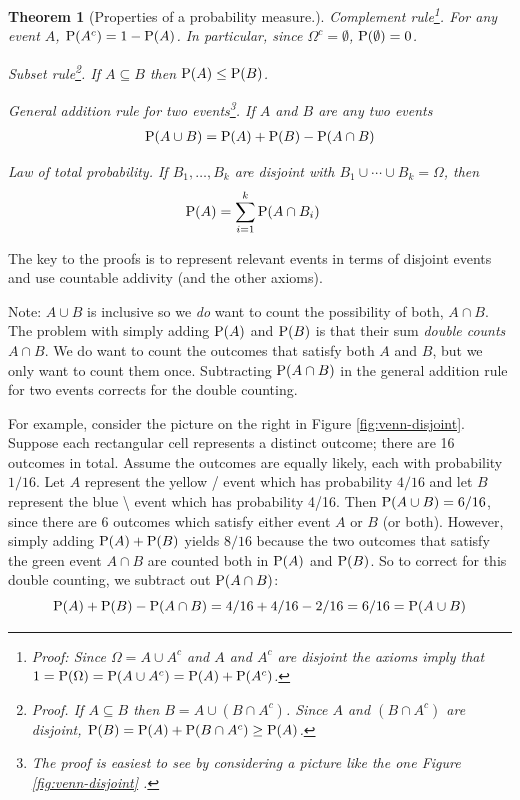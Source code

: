 \documentclass[
]{book}
\newtheorem{theorem}{Theorem}[chapter]
\theoremstyle{definition}
\theoremstyle{definition}
\theoremstyle{definition}
\theoremstyle{remark}
\begin{document}
\begin{theorem}[Properties of a probability measure.]
\protect\hypertarget{thm:prob-properties}{}{\label{thm:prob-properties} {} }
Complement rule\footnote{Proof: Since \(\Omega = A \cup A^c\) and \(A\) and \(A^c\) are disjoint the axioms imply that \(1=\textrm{P}(\Omega) = \textrm{P}(A \cup A^c) = \textrm{P}(A) + \textrm{P}(A^c)\).}. For any event \(A\), \(\textrm{P}(A^c) = 1 - \textrm{P}(A)\). In particular, since \(\Omega^c=\emptyset\), \(\textrm{P}(\emptyset)=0\).

Subset rule\footnote{Proof. If \(A \subseteq B\) then \(B = A \cup (B \cap A^c)\). Since \(A\) and \((B \cap A^c)\) are disjoint, \(\textrm{P}(B) = \textrm{P}(A) + \textrm{P}(B \cap A^c) \ge \textrm{P}(A)\).}. If \(A \subseteq B\) then \(\textrm{P}(A) \le \textrm{P}(B)\).

General addition rule for two events\footnote{The proof is easiest to see by considering a picture like the one Figure \ref{fig:venn-disjoint} .}. If \(A\) and \(B\) are any two events
\begin{align*}
\textrm{P}(A\cup B) = \textrm{P}(A) + \textrm{P}(B) - \textrm{P}(A \cap B)
\end{align*}

Law of total probability. If \(B_1,\ldots, B_k\) are disjoint with \(B_1\cup \cdots \cup B_k=\Omega\), then
\begin{align*}
\textrm{P}(A) & = \sum_{i=1}^k \textrm{P}(A \cap B_i)
\end{align*}
\end{theorem}

The key to the proofs is to represent relevant events in terms of disjoint events and use countable addivity (and the other axioms).

Note: \(A\cup B\) is inclusive so we \emph{do} want to count the possibility of both, \(A\cap B\). The problem with simply adding \(\textrm{P}(A)\) and \(\textrm{P}(B)\) is that their sum \emph{double counts} \(A \cap B\). We do want to count the outcomes that satisfy both \(A\) and \(B\), but we only want to count them once. Subtracting \(\textrm{P}(A \cap B)\) in the general addition rule for two events corrects for the double counting.

For example, consider the picture on the right in Figure \ref{fig:venn-disjoint}. Suppose each rectangular cell represents a distinct outcome; there are 16 outcomes in total. Assume the outcomes are equally likely, each with probability \(1/16\). Let \(A\) represent the yellow / event which has probability \(4/16\) and let \(B\) represent the blue \textbackslash{} event which has probability 4/16. Then \(\textrm{P}(A\cup B) = 6/16\), since there are 6 outcomes which satisfy either event \(A\) or \(B\) (or both). However, simply adding \(\textrm{P}(A)+\textrm{P}(B)\) yields \(8/16\) because the two outcomes that satisfy the green event \(A\cap B\) are counted both in \(\textrm{P}(A)\) and \(\textrm{P}(B)\). So to correct for this double counting, we subtract out \(\textrm{P}(A\cap B)\):
\[
\textrm{P}(A)+\textrm{P}(B)-\textrm{P}(A\cap B) = 4/16 + 4/16 -2/16 = 6/16 = \textrm{P}(A\cup B)
\]
\end{document}
